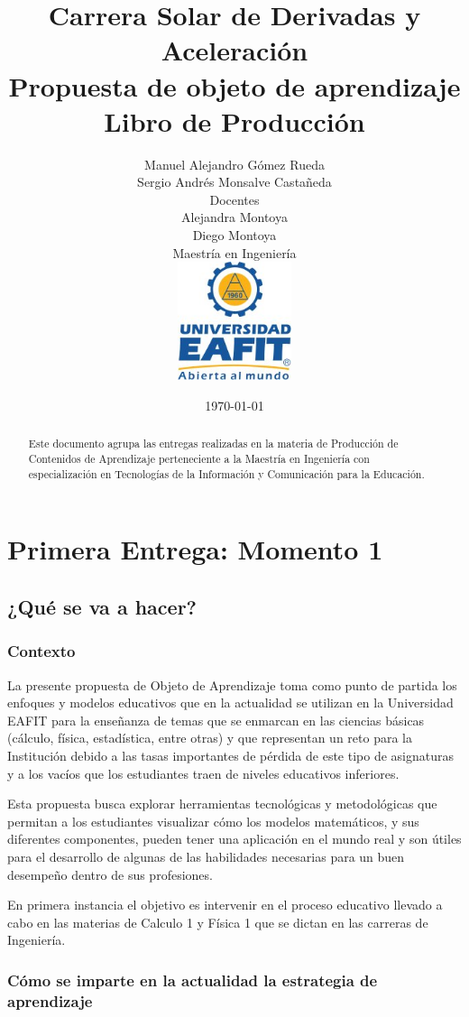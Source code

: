 \documentclass[twoside,letterpaper,12pt]{report}
\title{
Carrera Solar de Derivadas y Aceleración\\
Propuesta de objeto de aprendizaje\\[0.5cm]
Libro de Producción}
\date{\today}
\author{
	Manuel Alejandro Gómez Rueda\\
	Sergio Andrés Monsalve Castañeda \\[2cm]
	Docentes\\[0.5cm]
	Alejandra Montoya\\
	Diego Montoya\\[1cm]
	Maestría en Ingeniería \\[1cm]
	\includegraphics[width=0.25\textwidth]{aux/logo_eafit}
}
\begin{document}
\maketitle

\tableofcontents
\begin{abstract}
Este documento agrupa las entregas realizadas en la materia de Producción de Contenidos de Aprendizaje perteneciente a la Maestría en Ingeniería con especialización en Tecnologías de la Información y Comunicación para la Educación.
\end{abstract}

\chapter{Primera Entrega: Momento 1}

\section{¿Qué se va a hacer?}

\subsection{Contexto} %
\label{sub:contexto}

La presente propuesta de Objeto de Aprendizaje toma como punto de partida los enfoques y modelos educativos que en la actualidad se utilizan en la Universidad EAFIT para la enseñanza de temas que se enmarcan en las ciencias básicas (cálculo, física, estadística, entre otras) y que representan un reto para la Institución debido a las tasas importantes de pérdida de este tipo de asignaturas y a los vacíos que los estudiantes traen de niveles educativos inferiores.

Esta propuesta busca explorar herramientas tecnológicas y metodológicas que permitan a los estudiantes visualizar cómo los modelos matemáticos, y sus diferentes componentes, pueden tener una aplicación en el mundo real y son útiles para el desarrollo de algunas de las habilidades necesarias para un buen desempeño dentro de sus profesiones.

En primera instancia el objetivo es intervenir en el proceso educativo llevado a cabo en las materias de Calculo 1 y Física 1 que se dictan en las carreras de Ingeniería. 


\subsection{Cómo se imparte en la actualidad la estrategia de aprendizaje} %
\label{sub:c_mo_se_imparte_en_la_actualidad_la_estrategia_de_aprendizaje}
\end{document}
